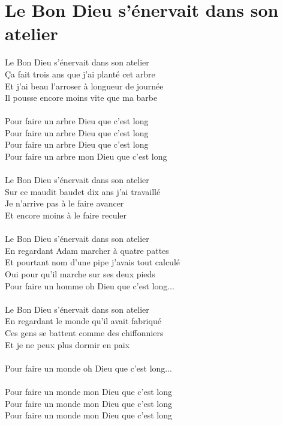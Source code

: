 \section*{Le Bon Dieu s'énervait dans son atelier}
Le Bon Dieu s'énervait dans son atelier\\
Ça fait trois ans que j'ai planté cet arbre\\
Et j'ai beau l'arroser à longueur de journée\\
Il pousse encore moins vite que ma barbe
\\\\
Pour faire un arbre Dieu que c'est long\\
Pour faire un arbre Dieu que c'est long\\
Pour faire un arbre Dieu que c'est long\\
Pour faire un arbre mon Dieu que c'est long
\\\\
Le Bon Dieu s'énervait dans son atelier\\
Sur ce maudit baudet dix ans j'ai travaillé\\
Je n'arrive pas à le faire avancer\\
Et encore moins à le faire reculer
\\\\
Le Bon Dieu s'énervait dans son atelier\\
En regardant Adam marcher à quatre pattes\\
Et pourtant nom d'une pipe j'avais tout calculé\\
Oui pour qu'il marche sur ses deux pieds\\
Pour faire un homme oh Dieu que c'est long...
\\\\
Le Bon Dieu s'énervait dans son atelier\\
En regardant le monde qu'il avait fabriqué\\
Ces gens se battent comme des chiffonniers\\
Et je ne peux plus dormir en paix
\\\\
Pour faire un monde oh Dieu que c'est long...
\\\\
Pour faire un monde mon Dieu que c'est long\\
Pour faire un monde mon Dieu que c'est long\\
Pour faire un monde mon Dieu que c'est long
